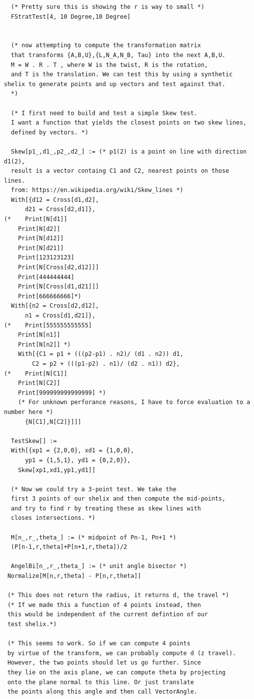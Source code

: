 \documentclass[11pt]{article}
\begin{document}
{\begin{verbatim}
  (* Pretty sure this is showing the r is way to small *)
  FStratTest[4, 10 Degree,10 Degree]


  (* now attempting to compute the transformation matrix
  that transforms {A,B,U},{L,N_A,N_B, Tau} into the next A,B,U.
  M = W . R . T , where W is the twist, R is the rotation,
  and T is the translation. We can test this by using a synthetic shelix to generate points and up vectors and test against that.
  *)

  (* I first need to build and test a simple Skew test.
  I want a function that yields the closest points on two skew lines,
  defined by vectors. *)

  Skew[p1_,d1_,p2_,d2_] := (* p1(2) is a point on line with direction d1(2),
  result is a vector containg C1 and C2, nearest points on those lines. 
  from: https://en.wikipedia.org/wiki/Skew_lines *)
  With[{d12 = Cross[d1,d2],
      d21 = Cross[d2,d1]},
(*    Print[N[d1]]
    Print[N[d2]]
    Print[N[d12]]
    Print[N[d21]]            
    Print[123123123]
    Print[N[Cross[d2,d12]]]
    Print[444444444]
    Print[N[Cross[d1,d21]]]    
    Print[666666666]*)
  With[{n2 = Cross[d2,d12],
      n1 = Cross[d1,d21]},
(*    Print[555555555555]
    Print[N[n1]]
    Print[N[n2]] *)
    With[{C1 = p1 + (((p2-p1) . n2)/ (d1 . n2)) d1,
        C2 = p2 + (((p1-p2) . n1)/ (d2 . n1)) d2},
(*    Print[N[C1]]
    Print[N[C2]]
    Print[999999999999999] *)
    (* For unknown perforance reasons, I have to force evaluation to a number here *)
      {N[C1],N[C2]}]]]

  TestSkew[] :=
  With[{xp1 = {2,0,0}, xd1 = {1,0,0},
      yp1 = {1,5,1}, yd1 = {0,2,0}},
    Skew[xp1,xd1,yp1,yd1]]

  (* Now we could try a 3-point test. We take the
  first 3 points of our shelix and then compute the mid-points,
  and try to find r by treating these as skew lines with
  closes intersections. *)

  M[n_,r_,theta_] := (* midpoint of Pn-1, Pn+1 *)
  (P[n-1,r,theta]+P[n+1,r,theta])/2

  AngelBi[n_,r_,theta_] := (* unit angle bisector *)
 Normalize[M[n,r,theta] - P[n,r,theta]]

 (* This does not return the radius, it returns d, the travel *)
 (* If we made this a function of 4 points instead, then
 this would be independent of the current defintion of our
 test shelix.*)

 (* This seems to work. So if we can compute 4 points
 by virtue of the transform, we can probably compute d (z travel).
 However, the two points should let us go further. Since
 they lie on the axis plane, we can compute theta by projecting
 onto the plane normal to this line. Or just translate
 the points along this angle and then call VectorAngle.


\end{verbatim}}
\end{document}
